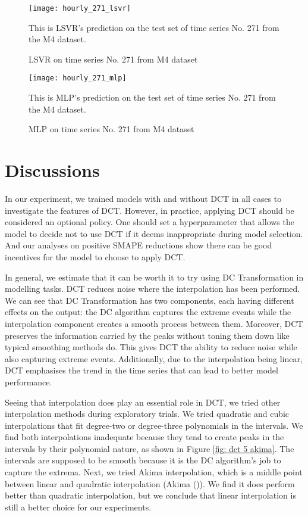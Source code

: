 \begin{figure}[H]
    \centering
    \texttt{[image: hourly\_271\_lsvr]}
    \caption{LSVR on time series No. 271 from M4 dataset}
    {\raggedright \footnotesize This is LSVR's prediction on the test set of time series No. 271 from the M4 dataset.  \par}
    \label{fig: hourly 271 lsvr}
\end{figure}
\begin{figure}[H]
    \centering
    \texttt{[image: hourly\_271\_mlp]}
    \caption{MLP on time series No. 271 from M4 dataset}
    {\raggedright \footnotesize This is MLP's prediction on the test set of time series No. 271 from the M4 dataset.  \par}
    \label{fig: hourly 271 mlp}
\end{figure}

\section{Discussions}
In our experiment, we trained models with and without DCT in all cases to investigate the features of DCT. However, in practice, applying DCT should be considered an optional policy. One should set a hyperparameter that allows the model to decide not to use DCT if it deems inappropriate during model selection. And our analyses on positive SMAPE reductions show there can be good incentives for the model to choose to apply DCT.

In general, we estimate that it can be worth it to try using DC Transformation in modelling tasks. DCT reduces noise where the interpolation has been performed. We can see that DC Transformation has two components, each having different effects on the output: the DC algorithm captures the extreme events while the interpolation component creates a smooth process between them. Moreover, DCT preserves the information carried by the peaks without toning them down like typical smoothing methods do. This gives DCT the ability to reduce noise while also capturing extreme events. Additionally, due to the interpolation being linear, DCT emphasises the trend in the time series that can lead to better model performance.

Seeing that interpolation does play an essential role in DCT, we tried other interpolation methods during exploratory trials. We tried quadratic and cubic interpolations that fit degree-two or degree-three polynomials in the intervals. We find both interpolations inadequate because they tend to create peaks in the intervals by their polynomial nature, as shown in Figure \ref{fig: dct 5 akima}. The intervals are supposed to be smooth because it is the DC algorithm's job to capture the extrema. Next, we tried Akima interpolation, which is a middle point between linear and quadratic interpolation (Akima (\citeyear{akima1970new})). We find it does perform better than quadratic interpolation, but we conclude that linear interpolation is still a better choice for our experiments.
